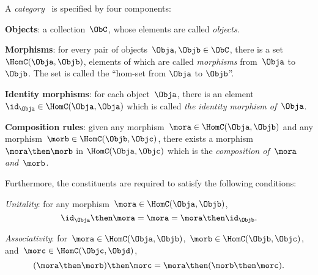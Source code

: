 \begin{ctdefinition}[Category]
  \label{def:categorymain}
  A \emph{category}~\CatC{} is specified by four components:
  \begin{compactenum}
    \item \textbf{Objects}: a collection\footnotemark~$\ObC$, whose elements are called \emph{objects}.
    \item \textbf{Morphisms}: for every pair of objects~$\Obja,\Objb\in \ObC$, there is a set~${ \HomC}({\Obja,\Objb})$, elements of which are called
    \emph{morphisms} from~$\Obja$ to~$ \Objb$. The set is called the ``hom-set from $\Obja$ to $\Objb$''.
    \item \textbf{Identity morphisms}: for each object~$ \Obja$, there is
    an element~$\id_{\Obja} \in \HomC({\Obja,\Obja}) $ which is called \emph{the identity
    morphism of~$\Obja$}.
    \item \textbf{Composition rules}: given any morphism~$ { \mora} \in  \HomC(\Obja,\Objb)$ and any morphism~${ \morb} \in \HomC(\Objb, \Objc)$, there exists a morphism~$\mora \then \morb$ in $\HomC(\Obja,\Objc)$ which is the \emph{composition of~$ \mora$ and~$ \morb$}.
  \end{compactenum}

  Furthermore, the constituents are required to satisfy the following conditions:
  \begin{compactenum}
    \item \emph{Unitality}: for any morphism~$\mora\in\HomC(\Obja,\Objb)$,
    \begin{equation}
      \id_\Obja \then \mora= \mora = \mora \then \id_\Objb.
    \end{equation}
    \item \emph{Associativity}: for~$\mora\in \HomC(\Obja,\Objb)$,~$\morb\in \HomC(\Objb,\Objc)$, and~$\morc\in \HomC(\Objc,\Objd)$,
    \begin{equation}
      (\mora\then \morb)\then \morc= \mora \then (\morb \then \morc).
    \end{equation}
  \end{compactenum}
\end{ctdefinition}


